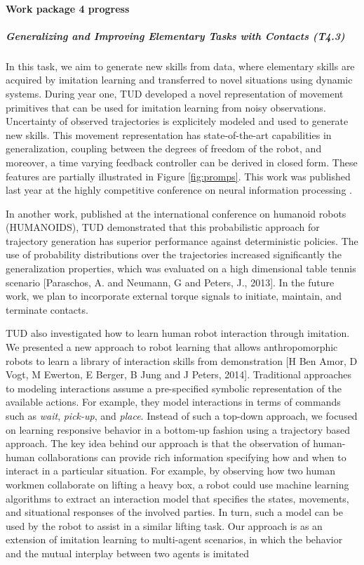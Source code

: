 

\paragraph{Work package 4 progress}

\subparagraph{Generalizing and Improving Elementary Tasks with Contacts (T4.3)}

In this task, we aim to generate new skills from data, where elementary skills 
are acquired by imitation learning and transferred to novel situations using 
dynamic systems. During year one, TUD developed a novel representation of 
movement primitives that can be used for imitation learning from noisy observations.
Uncertainty of observed trajectories is explicitely modeled and used to generate new skills.
This movement representation has state-of-the-art capabilities in generalization, 
coupling between the degrees of freedom of the robot, and moreover, 
a time varying feedback controller can be derived in closed form. 
These features are partially illustrated in Figure \ref{fig:promps}.
This work was published
last year at the highly competitive conference on neural information processing \cite{Paraschos_NIPS_2013}.


In another work, published at the international conference on humanoid robots (HUMANOIDS), 
TUD demonstrated that this probabilistic approach for trajectory generation
has superior performance against deterministic policies. The use of
probability distributions over the trajectories increased significantly
 the generalization properties, which was evaluated on a high dimensional table
tennis scenario [Paraschos, A. and  Neumann, G and  Peters, J., 2013]. 
In the future work, we plan to incorporate external torque signals to initiate, 
maintain, and terminate contacts.

TUD also investigated how to learn human robot interaction through imitation. We presented a new approach to robot learning that allows anthropomorphic robots to learn a library of interaction skills from demonstration [H Ben Amor, D Vogt, M Ewerton, E Berger, B Jung and J Peters, 2014]. Traditional approaches to modeling interactions assume a pre-specified symbolic representation of the available actions. For example, they model interactions
in terms of commands such as \emph{wait}, \emph{pick-up}, and \emph{place}. Instead of such a top-down approach, we focused on learning responsive behavior in a bottom-up fashion using a trajectory based approach. The key idea behind our approach is that the observation of human-human collaborations can provide rich information specifying how and when to interact
in a particular situation. For example, by observing how two human workmen collaborate on lifting a heavy box, a robot could use machine learning algorithms to extract an
interaction model that specifies the states, movements, and situational responses of the involved parties. In turn, such a model can be used by the robot to assist in a similar lifting task. Our approach is as an extension of imitation learning to multi-agent scenarios, in which the behavior and the mutual interplay between two agents is imitated


